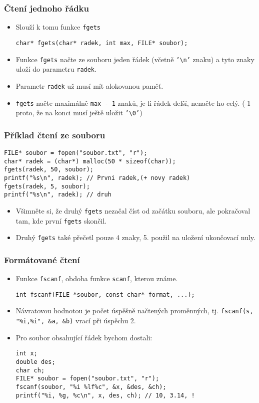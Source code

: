 \documentclass{beamer}
\newenvironment{itemizex}%
  {\large \begin{itemize}%
    \setlength{\itemsep}{8pt}%
    \setlength{\parskip}{8pt}}%
  {\end{itemize}}
\begin{document}
\begin{frame}[t,fragile]\frametitle{Čtení jednoho řádku} 
    \begin{itemizex}
        \item Slouží k tomu funkce \texttt{fgets}
\begin{verbatim} 
char* fgets(char* radek, int max, FILE* soubor);
\end{verbatim}
        \item Funkce \texttt{fgets} načte ze souboru jeden řádek (včetně \texttt{'\textbackslash n'} znaku) a tyto znaky uloží do parametru \texttt{radek}. 
        \item Parametr \texttt{radek} už musí mít alokovanou paměť.
        \item \texttt{fgets} načte maximálně \texttt{max - 1} znaků, je-li řádek delší, nenačte ho celý. (-1 proto, že na konci musí ještě uložit \texttt{'\textbackslash0'})
    \end{itemizex}
\end{frame}


\begin{frame}[t,fragile]\frametitle{Příklad čtení ze souboru} 
\begin{verbatim} 
FILE* soubor = fopen("soubor.txt", "r");
char* radek = (char*) malloc(50 * sizeof(char));
fgets(radek, 50, soubor);
printf("%s\n", radek); // Prvni radek,(+ novy radek)
fgets(radek, 5, soubor);
printf("%s\n", radek); // druh
\end{verbatim}


\begin{itemizex}
    \item Všimněte si, že druhý \texttt{fgets} nezačal číst od začátku souboru, ale pokračoval tam, kde první \texttt{fgets} skončil. 
    \item Druhý \texttt{fgets} také přečetl pouze 4 znaky, 5. použil na uložení ukončovací nuly. 
\end{itemizex}
\end{frame}



\begin{frame}[t,fragile]\frametitle{Formátované čtení} 
    \begin{itemize}
        \item Funkce \texttt{fscanf}, obdoba funkce \texttt{scanf}, kterou známe. 
\begin{verbatim} 
int fscanf(FILE *soubor, const char* format, ...);
\end{verbatim}
        \item Návratovou hodnotou je počet úspěšně načtených proměnných, tj. \texttt{fscanf(s, "\%i,\%i", \&a, \&b)} vrací při úspěchu 2.
        \item Pro soubor obsahující řádek  bychom dostali:
\begin{verbatim} 
int x;
double des;
char ch;
FILE* soubor = fopen("soubor.txt", "r");
fscanf(soubor, "%i %lf%c", &x, &des, &ch);
printf("%i, %g, %c\n", x, des, ch); // 10, 3.14, !
\end{verbatim}
    \end{itemize}
\end{frame}
\end{document}
